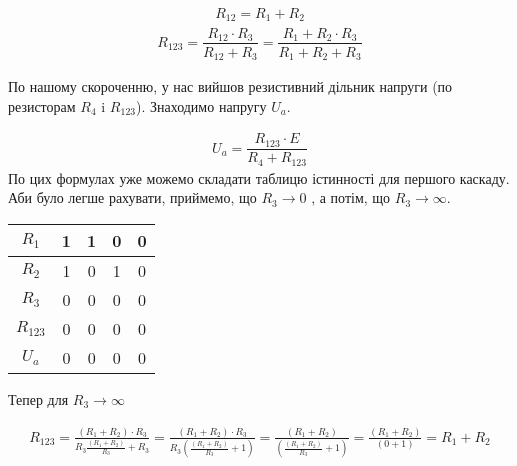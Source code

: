 \documentclass[a4paper,14pt]{extreport}
\begin{document}
\newpage

\begin{figure}[h!]
\label{ris4}
\end{figure}

\begin{align}
  R_{12} = R_1 + R_2
\end{align}
\begin{align}
  R_{123} = \dfrac{R_{12} \cdot R_3}{R_{12} + R_3} = \dfrac{R_{1}+R_{2} \cdot R_3}{R_{1}+R_{2} + R_3}
\end{align}

По нашому скороченню, у нас вийшов резистивний дільник напруги (по резисторам $R_{4}$ i $R_{123}$). Знаходимо напругу $U_a$.

\begin{align}
  U_a = \dfrac{R_{123} \cdot E}{R_{4} + R_{123}}
\end{align}
По цих формулах уже можемо складати таблицю істинності для першого каскаду. Аби було легше рахувати, приймемо, що $R_{3} \rightarrow 0$ , а потім, що $R_{3} \rightarrow \infty$.

\begin{table}[h]
  \begin{center}
    \begin{tabular}{|c|c|c|c|c|}
    \hline
    $R_1 $  & 1 & 1 & 0 & 0 \\ \hline
    $R_2 $  & 1 & 0 & 1 & 0 \\ \hline
    $R_3 $  & 0 & 0 & 0 & 0 \\ \hline
    $R_{123} $& 0 & 0 & 0 & 0 \\ \hline
    $U_a  $ & 0 & 0 & 0 & 0 \\ \hline
    \end{tabular}
  \end{center}
\end{table}
Тепер для $R_{3} \rightarrow \infty$













\begin{align}
R_{123}=\frac{\left(R_{1}+R_{2}\right) \cdot R_{3}}{R_{3} \frac{\left(R_{1}+R_{2}\right)}{R_{3}}+R_{3}}=\frac{\left(R_{1}+R_{2}\right) \cdot R_{3}}{R_{3}\left(\frac{\left(R_{1}+R_{2}\right)}{R_{3}}+1\right)}=
 \frac{\left(R_{1}+R_{2}\right)}{\left(\frac{\left(R_{1}+R_{2}\right)}{R_{3}}+1\right)}=\frac{\left(R_{1}+R_{2}\right)}{(0+1)}=R_{1}+R_{2}
\end{align}
\end{document}
